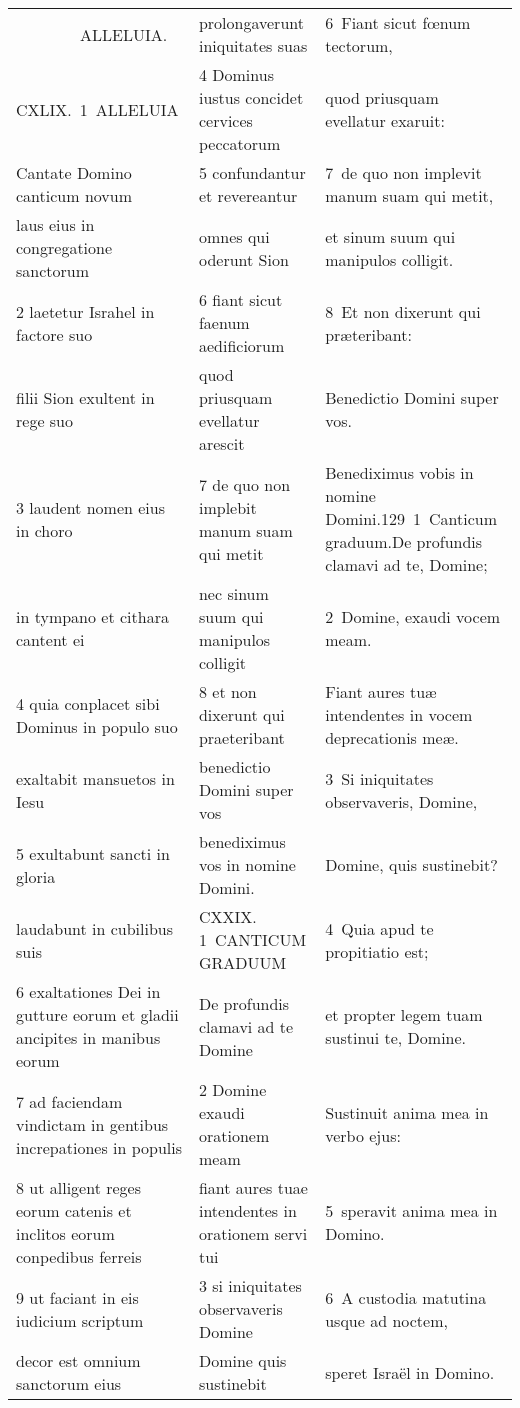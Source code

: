 \documentclass{article}
\begin{document}
\begin{longtable}{@{}p{}p{}p{}@{}}
    ALLELUIA.	&	prolongaverunt iniquitates suas	&	6 Fiant sicut fœnum tectorum,	\\
CXLIX. 1 ALLELUIA	&	4 Dominus iustus concidet cervices peccatorum	&	quod priusquam evellatur exaruit:	\\
Cantate Domino canticum novum	&	5 confundantur et revereantur	&	7 de quo non implevit manum suam qui metit,	\\
laus eius in congregatione sanctorum	&	omnes qui oderunt Sion	&	et sinum suum qui manipulos colligit.	\\
2 laetetur Israhel in factore suo	&	6 fiant sicut faenum aedificiorum	&	8 Et non dixerunt qui præteribant:	\\
filii Sion exultent in rege suo	&	quod priusquam evellatur arescit	&	Benedictio Domini super vos.	\\
3 laudent nomen eius in choro	&	7 de quo non implebit manum suam qui metit	&	Benediximus vobis in nomine Domini.129 1 Canticum graduum.De profundis clamavi ad te, Domine;	\\
in tympano et cithara cantent ei	&	nec sinum suum qui manipulos colligit	&	2 Domine, exaudi vocem meam.	\\
4 quia conplacet sibi Dominus in populo suo	&	8 et non dixerunt qui praeteribant	&	Fiant aures tuæ intendentes in vocem deprecationis meæ.	\\
exaltabit mansuetos in Iesu	&	benedictio Domini super vos	&	3 Si iniquitates observaveris, Domine,	\\
5 exultabunt sancti in gloria	&	benediximus vos in nomine Domini.	&	Domine, quis sustinebit?	\\
laudabunt in cubilibus suis	&	CXXIX. 1 CANTICUM GRADUUM	&	4 Quia apud te propitiatio est;	\\
6 exaltationes Dei in gutture eorum et gladii ancipites in manibus eorum	&	De profundis clamavi ad te Domine	&	et propter legem tuam sustinui te, Domine.	\\
7 ad faciendam vindictam in gentibus increpationes in populis	&	2 Domine exaudi orationem meam	&	Sustinuit anima mea in verbo ejus:	\\
8 ut alligent reges eorum catenis et inclitos eorum conpedibus ferreis	&	fiant aures tuae intendentes in orationem servi tui	&	5 speravit anima mea in Domino.	\\
9 ut faciant in eis iudicium scriptum	&	3 si iniquitates observaveris Domine	&	6 A custodia matutina usque ad noctem,	\\
decor est omnium sanctorum eius	&	Domine quis sustinebit	&	speret Israël in Domino.	\\

\end{longtable}
\end{document}
